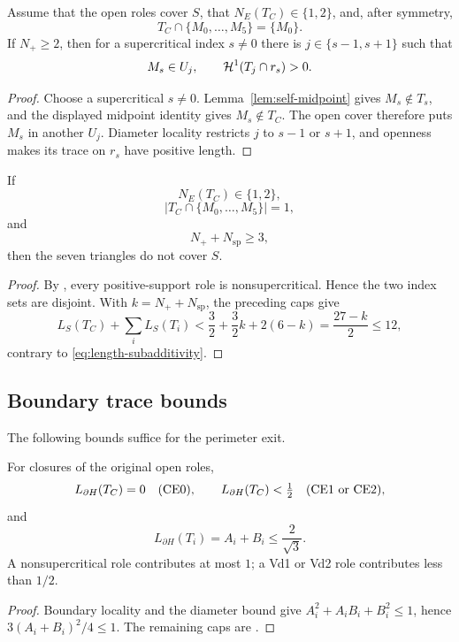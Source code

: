 \begin{lemma}
\label{lem:positive-support-rescuer}
Assume that the open roles cover $S$, that $N_E(T_C)\in\{1,2\}$, and,
after symmetry,
\[
 T_C\cap\{M_0,\ldots,M_5\}=\{M_0\}.
\]
If $N_+\ge2$, then for a supercritical index $s\ne0$ there is
$j\in\{s-1,s+1\}$ such that
\[
 M_s\in U_j,
 \qquad \mathcal H^1(T_j\cap r_s)>0.
\]
\end{lemma}

\begin{proof}
Choose a supercritical $s\ne0$.  Lemma~\ref{lem:self-midpoint} gives
$M_s\notin T_s$, and the displayed midpoint identity gives
$M_s\notin T_C$.  The open cover therefore puts $M_s$ in another $U_j$.
Diameter locality restricts $j$ to $s-1$ or $s+1$, and openness makes its
trace on $r_s$ have positive length.
\end{proof}

\begin{theorem}
\label{thm:common-skeleton-count}
If
\[
 N_E(T_C)\in\{1,2\},
\]
\[
 \left|T_C\cap\{M_0,\ldots,M_5\}\right|=1,
\]
and
\begin{equation}
 N_++N_{\mathrm{sp}}\ge3,
 \label{eq:common-skeleton-count}
\end{equation}
then the seven triangles do not cover $S$.
\end{theorem}

\begin{proof}
By , every
positive-support role is nonsupercritical. Hence the two index sets are disjoint. With $k=N_++N_{\mathrm{sp}}$,
the preceding caps give
\[
 L_S(T_C)+\sum_iL_S(T_i)
 <\frac32+\frac32k+2(6-k)=\frac{27-k}{2}\le12,
\]
contrary to \eqref{eq:length-subadditivity}.
\end{proof}

\subsection{Boundary trace bounds}

The following bounds suffice for the perimeter exit.

\begin{theorem}
\label{thm:boundary-trace-table}
For closures of the original open roles,
\[
 L_{\partial H}(T_C)=0\quad(\mathrm{CE0}),\qquad
 L_{\partial H}(T_C)<\tfrac12\quad(\mathrm{CE1}\text{ or }\mathrm{CE2}),
\]
and
\begin{equation}
 L_{\partial H}(T_i)=A_i+B_i\le\frac2{\sqrt3}.
 \label{eq:vertex-boundary-locality}
\end{equation}
A nonsupercritical role contributes at most $1$; a Vd1 or Vd2 role
contributes less than $1/2$.
\end{theorem}
\begin{proof}
Boundary locality and the diameter bound give
$A_i^2+A_iB_i+B_i^2\le1$, hence
$3(A_i+B_i)^2/4\le1$. The remaining caps are
.
\end{proof}

